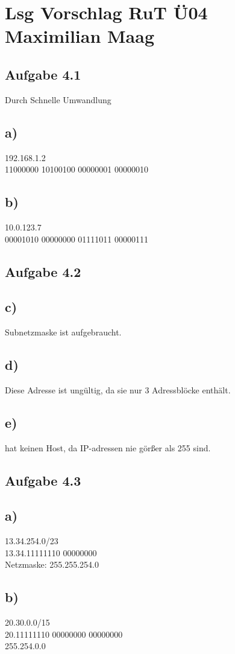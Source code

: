 \documentclass{article}
\begin{document}
	\section*{Lsg Vorschlag RuT Ü04 Maximilian Maag}
	\subsection*{Aufgabe 4.1}
	Durch Schnelle Umwandlung
	\subsection*{a)}
	192.168.1.2 \\
	11000000 10100100 00000001 00000010
	\subsection*{b)}
	10.0.123.7 \\
	00001010 00000000 01111011 00000111
	
	\subsection*{Aufgabe 4.2}
	\subsection*{c)}
	Subnetzmaske ist aufgebraucht.
	\subsection*{d)}
	Diese Adresse ist ungültig, da sie nur 3 Adressblöcke enthält.
	\subsection*{e)}
	hat keinen Host, da IP-adressen nie görßer als 255 sind.
	\subsection*{Aufgabe 4.3}
	\subsection*{a)}
	13.34.254.0/23 \\
	13.34.11111110 00000000 \\
	Netzmaske: 255.255.254.0 \\
	\subsection*{b)}
	20.30.0.0/15 \\
	20.11111110 00000000 00000000 \\
	255.254.0.0
\end{document}
